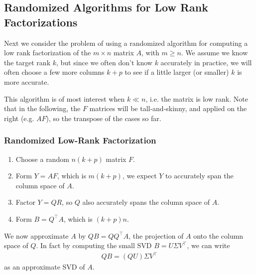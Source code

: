 \documentclass[11pt]{article}
\numberwithin{equation}{section}
\begin{document}
\subsection{Randomized Algorithms for Low Rank Factorizations}
Next we consider the problem of using a randomized algorithm for computing a low rank factorization of the $m \times n$ matrix $A$, with $m \geq n$.
We assume we know the target rank $k$, but since we often don't know $k$ accurately in practice, 
we will often choose a few more columns $k+p$ to see if a little larger (or smaller) $k$ is more accurate.

This algorithm is of most interest when $k \ll n$, i.e. the matrix is low rank. Note that in the following, the $F$ matrices will be tall-and-skinny, 
and applied on the right (e.g. $AF$), so the transpose of the cases so far.

\subsubsection{Randomized Low-Rank Factorization}
\begin{enumerate}
    \item Choose a random $n(k+p)$ matrix $F$.
    \item Form $Y = AF$, which is $m(k+p)$, we expect $Y$ to accurately span the column space of $A$.
    \item Factor $Y = QR$, so $Q$ also accurately spans the column space of $A$.
    \item Form $B = Q^\top A$, which is $(k+p)n$.
\end{enumerate}

We now approximate $A$ by $QB = QQ^\top A$, the projection of $A$ onto the column space of $Q$.
In fact by computing the small SVD $B = U\Sigma V^\top$, we can write \begin{align*}
    QB = (QU)\Sigma V^\top
\end{align*}
as an approximate SVD of $A$.
\end{document}
